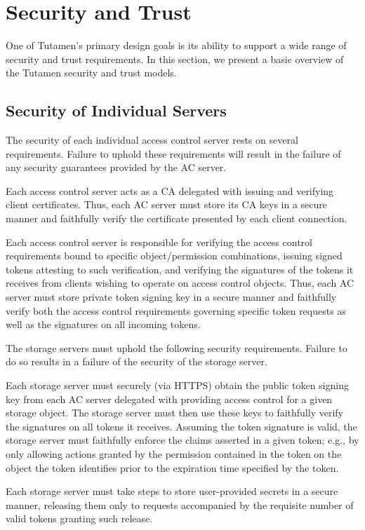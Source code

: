 \section{Security and Trust}
\label{sec:trust}

One of Tutamen's primary design goals is its ability to support a wide
range of security and trust requirements. In this section, we present
a basic overview of the Tutamen security and trust models.

\subsection{Security of Individual Servers}

The security of each individual access control server rests on several
requirements. Failure to uphold these requirements will result in the
failure of any security guarantees provided by the AC server.

\begin{packed_desc}
\item[Certificate Authority Role:] Each access control server acts as
  a CA delegated with issuing and verifying client certificates. Thus,
  each AC server must store its CA keys in a secure manner and
  faithfully verify the certificate presented by each client
  connection.
\item[Token Issuance and Verification:] Each access control server is
  responsible for verifying the access control requirements bound to
  specific object/permission combinations, issuing signed tokens
  attesting to such verification, and verifying the signatures of the
  tokens it receives from clients wishing to operate on access control
  objects. Thus, each AC server must store private token signing key
  in a secure manner and faithfully verify both the access control
  requirements governing specific token requests as well as the
  signatures on all incoming tokens.
\end{packed_desc}

The storage servers must uphold the following security
requirements. Failure to do so results in a failure of the security of
the storage server.

\begin{packed_desc}
\item[Token Verification:] Each storage server must securely (via
  HTTPS) obtain the public token signing key from each AC server
  delegated with providing access control for a given storage
  object. The storage server must then use these keys to faithfully
  verify the signatures on all tokens it receives. Assuming the token
  signature is valid, the storage server must faithfully enforce the
  claims asserted in a given token; e.g., by only allowing actions
  granted by the permission contained in the token on the object the
  token identifies prior to the expiration time specified by the
  token.
\item[Secure Storage:] Each storage server must take steps to store
  user-provided secrets in a secure manner, releasing them only to
  requests accompanied by the requisite number of valid tokens
  granting such release.
\end{packed_desc}

